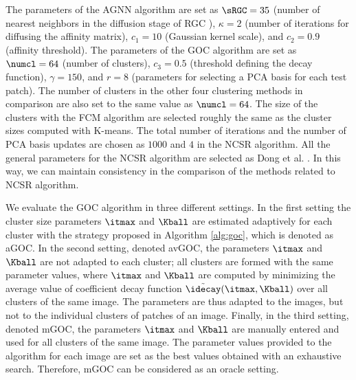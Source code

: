 \documentclass[journal]{IEEEtran}
\begin{document}
The parameters of the AGNN algorithm are set as  $\sRGC=35$ (number of nearest neighbors in the diffusion stage of RGC \cite{Donoser13replicator}), $\kappa=2$ (number of iterations for diffusing the affinity matrix),  $c_1=10$ (Gaussian kernel scale), and $c_2=0.9$ (affinity threshold). The parameters of the GOC algorithm are set as $\numcl=64$ (number of clusters), $c_3 = 0.5$ (threshold defining the decay function), $\gamma=150$, and $r=8$ (parameters for selecting a PCA basis for each test patch). The number of clusters in the other four clustering methods in comparison are also set to the same value as $\numcl=64$. The size of the clusters with the FCM algorithm are selected roughly the same as the cluster sizes computed with K-means. The total number of iterations and the number of PCA basis updates are chosen as $1000$ and $4$ in the NCSR algorithm. All the general parameters for the NCSR algorithm are selected as Dong et al. \cite{Dong13nonlocally}. In this way, we can maintain consistency in the comparison of the methods related to NCSR algorithm.


We evaluate the GOC algorithm in three different settings. In the first setting  the cluster size parameters $\itmax$ and $\Kball$ are estimated adaptively for each cluster with the strategy proposed in Algorithm \ref{alg:goc}, which is denoted as aGOC. In the second setting, denoted avGOC, the parameters $\itmax$ and $\Kball$ are not adapted to each cluster; all clusters are formed with the same parameter values, where $\itmax$ and $\Kball$ are computed by minimizing the average value of coefficient decay function $\tilde \idecay(\itmax, \Kball) $ over all clusters of the same image. The parameters are thus adapted to the images, but not to the individual clusters of patches of an image. Finally, in the third setting, denoted mGOC, the parameters $\itmax$ and $\Kball$ are manually entered and used for all clusters of the same image. The parameter values provided to the algorithm for each image are set as the best values  obtained with an exhaustive search. Therefore, mGOC can be considered as an oracle setting. 
\end{document}
